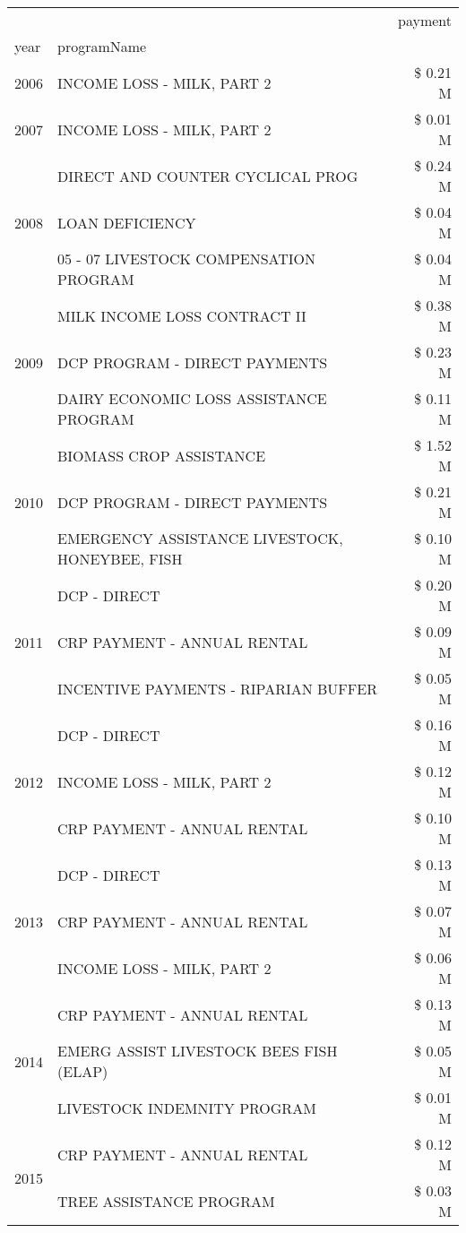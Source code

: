 \begin{tabular}{llr}
\toprule
 &  & payment \\
year & programName &  \\
\midrule
2006 & INCOME LOSS - MILK, PART 2 & \$ 0.21 M \\
\cline{1-3}
2007 & INCOME LOSS - MILK, PART 2 & \$ 0.01 M \\
\cline{1-3}
\multirow[t]{3}{*}{2008} & DIRECT AND COUNTER CYCLICAL PROG & \$ 0.24 M \\
 & LOAN DEFICIENCY & \$ 0.04 M \\
 & 05 - 07 LIVESTOCK COMPENSATION PROGRAM & \$ 0.04 M \\
\cline{1-3}
\multirow[t]{3}{*}{2009} & MILK INCOME LOSS CONTRACT II & \$ 0.38 M \\
 & DCP PROGRAM - DIRECT PAYMENTS & \$ 0.23 M \\
 & DAIRY ECONOMIC LOSS ASSISTANCE PROGRAM & \$ 0.11 M \\
\cline{1-3}
\multirow[t]{3}{*}{2010} & BIOMASS CROP ASSISTANCE & \$ 1.52 M \\
 & DCP PROGRAM - DIRECT PAYMENTS & \$ 0.21 M \\
 & EMERGENCY ASSISTANCE LIVESTOCK, HONEYBEE, FISH & \$ 0.10 M \\
\cline{1-3}
\multirow[t]{3}{*}{2011} & DCP - DIRECT & \$ 0.20 M \\
 & CRP PAYMENT - ANNUAL RENTAL & \$ 0.09 M \\
 & INCENTIVE PAYMENTS - RIPARIAN BUFFER & \$ 0.05 M \\
\cline{1-3}
\multirow[t]{3}{*}{2012} & DCP - DIRECT & \$ 0.16 M \\
 & INCOME LOSS - MILK, PART 2 & \$ 0.12 M \\
 & CRP PAYMENT - ANNUAL RENTAL & \$ 0.10 M \\
\cline{1-3}
\multirow[t]{3}{*}{2013} & DCP - DIRECT & \$ 0.13 M \\
 & CRP PAYMENT - ANNUAL RENTAL & \$ 0.07 M \\
 & INCOME LOSS - MILK, PART 2 & \$ 0.06 M \\
\cline{1-3}
\multirow[t]{3}{*}{2014} & CRP PAYMENT - ANNUAL RENTAL & \$ 0.13 M \\
 & EMERG ASSIST LIVESTOCK BEES FISH (ELAP) & \$ 0.05 M \\
 & LIVESTOCK INDEMNITY PROGRAM & \$ 0.01 M \\
\cline{1-3}
\multirow[t]{3}{*}{2015} & CRP PAYMENT - ANNUAL RENTAL & \$ 0.12 M \\
 & TREE ASSISTANCE PROGRAM & \$ 0.03 M \\

\end{tabular}
